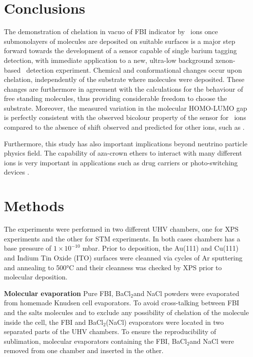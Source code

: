 \documentclass[aps,prl,reprint,longbibliography,superscriptaddress, english]{revtex4-1}
\def\BappCl{BaCl$_2$}
\begin{document}
\section{Conclusions}
The demonstration of chelation in vacuo of FBI indicator by \Bapp\ ions once submonolayers of molecules are deposited on suitable surfaces is a major step forward towards the development of a sensor capable of single barium tagging detection, with immediate application to a new, ultra-low background xenon-based \bbonu\ detection experiment. Chemical and conformational changes occur upon chelation, independently of the substrate where molecules were deposited. These changes are furthermore in agreement with the calculations for the behaviour of free standing molecules, thus providing considerable freedom to choose the substrate. Moreover, the measured variation in the molecular HOMO-LUMO gap is perfectly consistent with the observed bicolour property of the sensor for \Bapp\ ions compared to the absence of shift observed and predicted for other ions, such as \Nap.  

Furthermore, this study has also important implications beyond neutrino particle physics field. The capability of {aza-crown ethers} to interact with many different ions is very important in applications such as drug carriers \cite{uchegbu_non-ionic_1998} or photo-switching devices \cite{malval_photoswitching_2002,uda_membrane_2005}. 


\section{Methods}
The experiments were performed in two different UHV chambers, one for XPS experiments and the other for STM experiments. In both cases chambers has a base pressure of $1\times10^{-10}$ mbar. Prior to deposition, the Au(111) and Cu(111) and Indium Tin Oxide (ITO) surfaces were cleanned via cycles of Ar sputtering and annealing to 500°C and their cleanness was checked by XPS prior to molecular deposition. 

\textbf{Molecular evaporation}
Pure FBI, \BappCl and NaCl powders were evaporated from homemade Knudsen cell evaporators. To avoid cross-talking between FBI and the salts molecules and to exclude any possibility of chelation of the molecule inside the cell, the FBI and \BappCl (NaCl) evaporators were located in two separated parts of the UHV chambers. To ensure the reproducibility of sublimation, molecular evaporators containing the FBI, \BappCl and NaCl were removed from one chamber and inserted in the other.  
\end{document}
